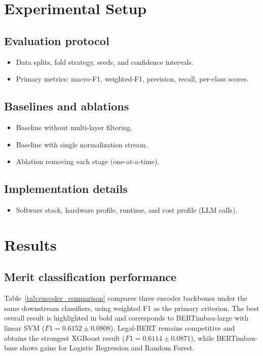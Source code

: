\documentclass[preprint,a4paper,fleqn]{cas-dc}
\begin{document}
\section{Experimental Setup}
\label{sec:experiments}
\subsection{Evaluation protocol}
\begin{itemize}
    \item Data splits, fold strategy, seeds, and confidence intervals.
    \item Primary metrics: macro-F1, weighted-F1, precision, recall, per-class scores.
\end{itemize}

\subsection{Baselines and ablations}
\begin{itemize}
    \item Baseline without multi-layer filtering.
    \item Baseline with single normalization stream.
    \item Ablation removing each stage (one-at-a-time).
\end{itemize}

\subsection{Implementation details}
\begin{itemize}
    \item Software stack, hardware profile, runtime, and cost profile (LLM calls).
\end{itemize}

\section{Results}
\label{sec:results}
\subsection{Merit classification performance}
Table~\ref{tab:encoder_comparison} compares three encoder backbones under the same downstream classifiers, using weighted F1 as the primary criterion. The best overall result is highlighted in bold and corresponds to BERTimbau-large with linear SVM ($F1=0.6152 \pm 0.0808$). Legal-BERT remains competitive and obtains the strongest XGBoost result ($F1=0.6114 \pm 0.0871$), while BERTimbau-base shows gains for Logistic Regression and Random Forest.
\end{document}
